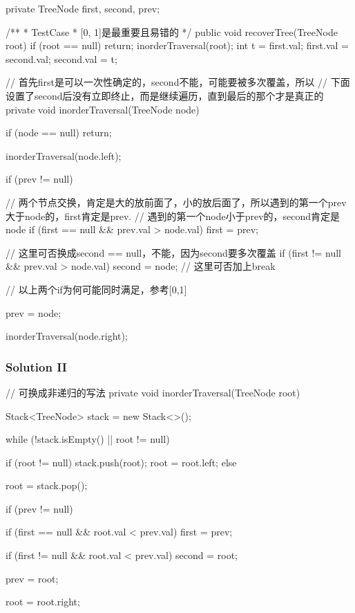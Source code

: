 \begin{Code}
private TreeNode first, second, prev;

/**
 * TestCase
 * [0, 1]是最重要且易错的
 */
public void recoverTree(TreeNode root) {
    if (root == null) {
        return;
    }
    inorderTraversal(root);
    int t = first.val;
    first.val = second.val;
    second.val = t;
}

// 首先first是可以一次性确定的，second不能，可能要被多次覆盖，所以
// 下面设置了second后没有立即终止，而是继续遍历，直到最后的那个才是真正的
private void inorderTraversal(TreeNode node) {
    if (node == null) {
        return;
    }

    inorderTraversal(node.left);

    if (prev != null) {
        // 两个节点交换，肯定是大的放前面了，小的放后面了，所以遇到的第一个prev大于node的，first肯定是prev.
        // 遇到的第一个node小于prev的，second肯定是node
        if (first == null && prev.val > node.val) {
            first = prev;
        }

        // 这里可否换成second == null，不能，因为second要多次覆盖
        if (first != null && prev.val > node.val) {
            second = node;
            // 这里可否加上break
        }

        // 以上两个if为何可能同时满足，参考[0,1]
    }

    prev = node;

    inorderTraversal(node.right);
}
\end{Code}

\subsubsection{Solution II}
\begin{Code}
// 可换成非递归的写法
private void inorderTraversal(TreeNode root) {
    Stack<TreeNode> stack = new Stack<>();

    while (!stack.isEmpty() || root != null) {
        if (root != null) {
            stack.push(root);
            root = root.left;
        } else {
            root = stack.pop();

            if (prev != null) {
                if (first == null && root.val < prev.val) {
                    first = prev;
                }

                if (first != null && root.val < prev.val) {
                    second = root;
                }
            }

            prev = root;

            root = root.right;
        }
    }
}
\end{Code}


